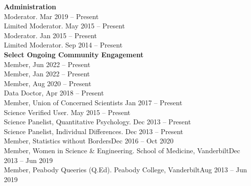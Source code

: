 {\large \textbf{Administration}}\\
Moderator. \hfill{Mar 2019 – Present}\smallskip\\
Limited Moderator. \hfill{May 2015 – Present}\smallskip\\
Moderator. \hfill{Jan 2015 – Present}\smallskip\\
Limited Moderator. \hfill{Sep 2014 – Present}\medskip\\
%
%
{\large \textbf{Select Ongoing Community Engagement}}\smallskip\\
%
Member,  \hfill{Jun 2022 – Present}\smallskip\\
Member,  \hfill{Jan 2022 – Present}\smallskip\\
Member,  \hfill{Aug 2020 – Present}\smallskip\\
Data Doctor,  \hfill{Apr 2018 – Present}\smallskip\\
Member, Union of Concerned Scientists \hfill{Jan 2017 – Present}\smallskip\\
Science Verified User. \hfill{May 2015 – Present}\smallskip\\
Science Panelist, Quantitative Psychology. \hfill{Dec 2013 – Present}\smallskip\\%
Science Panelist, Individual Differences. \hfill{Dec 2013 – Present}\smallskip\\
Member, Statistics without Borders\hfill{Dec 2016 – Oct 2020}\smallskip\\
Member, Women in Science \& Engineering. School of Medicine, Vanderbilt\hfill{Dec 2013 – Jun 2019}\smallskip\\
Member, Peabody Queeries (Q.Ed). Peabody College, Vanderbilt\hfill{Aug 2013 – Jun 2019}\medskip\\
